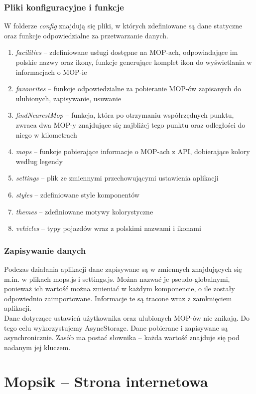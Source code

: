 \subsection{Pliki konfiguracyjne i funkcje}
W folderze \textit{config} znajdują się pliki, w których zdefiniowane są dane statyczne oraz funkcje odpowiedzialne za przetwarzanie danych.
\begin{enumerate}
\item \textit{facilities} -- zdefiniowane usługi dostępne na MOP-ach, odpowiadające im polskie nazwy oraz ikony, funkcje generujące komplet ikon do wyświetlania w informacjach o MOP-ie
\item \textit{favourites} -- funkcje odpowiedzialne za pobieranie MOP-ów zapisanych do ulubionych, zapisywanie, usuwanie
\item \textit{findNearestMop} -- funkcja, która po otrzymaniu współrzędnych punktu, zwraca dwa MOP-y znajdujące się najbliżej tego punktu oraz odległości do niego w kilometrach
\item \textit{mops} -- funkcje pobierające informacje o MOP-ach z API, dobierające kolory według legendy
\item \textit{settings} -- plik ze zmiennymi przechowującymi ustawienia aplikacji
\item \textit{styles} -- zdefiniowane style komponentów
\item \textit{themes} -- zdefiniowane motywy kolorystyczne
\item \textit{vehicles} -- typy pojazdów wraz z polskimi nazwami i ikonami
\end{enumerate}

\subsection{Zapisywanie danych}
Podczas działania aplikacji dane zapisywane są w zmiennych znajdujących się m.in. w plikach mops.js i settings.js. Można nazwać je pseudo-globalnymi, ponieważ ich wartość można zmieniać w każdym komponencie, o ile zostały odpowiednio zaimportowane. Informacje te są tracone wraz z zamknięciem aplikacji.\\
Dane dotyczące ustawień użytkownika oraz ulubionych MOP-ów nie znikają. Do tego celu wykorzystujemy AsyncStorage. Dane pobierane i zapisywane są asynchronicznie. Zasób ma postać słownika -- każda wartość znajduje się pod nadanym jej kluczem.


\chapter{Mopsik -- Strona internetowa}
\label{mopsik_web}

